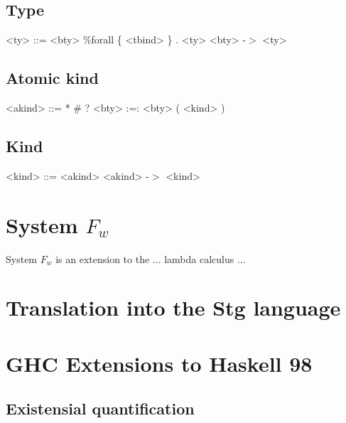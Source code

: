 \subsection{Type}

\begin{grammar}
<ty> ::= <bty>
    \alt \%forall \{ <tbind> \} . <ty>
    \alt <bty> -$>$ <ty>
\end{grammar}

\subsection{Atomic kind}

\begin{grammar}
<akind> ::= *
       \alt \#
       \alt ?
       \alt <bty> :=: <bty>
       \alt ( <kind> )
\end{grammar}

\subsection{Kind}

\begin{grammar}
<kind> ::= <akind>
      \alt <akind> -$>$ <kind>
\end{grammar}

\section{System $F_w$}

System $F_w$ is an extension to the ... lambda calculus ...



\section{Translation into the Stg language}



\section{GHC Extensions to Haskell 98}

\subsection{Existensial quantification}
